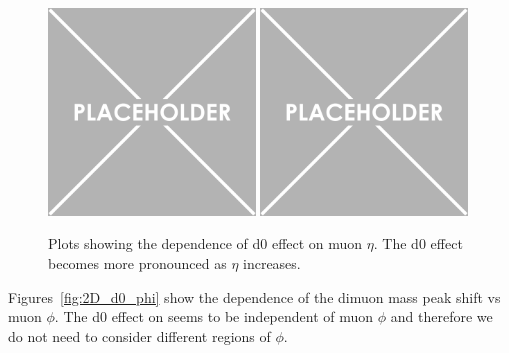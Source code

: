 \begin{figure}[h!]
    \centering
    \includegraphics[width=0.49\textwidth]{images_geofit/dimu_mass_vs_eta_MC.png}
    \includegraphics[width=0.49\textwidth]{images_geofit/dimu_mass_vs_eta_data.png}
    \caption{Plots showing the dependence of d0 effect on muon $\eta$. The d0 effect becomes more pronounced as $\eta$ increases.}
    \label{fig:2D_d0_eta}
\end{figure}

Figures~\ref{fig:2D_d0_phi} show the dependence of the dimuon mass peak shift vs muon $\phi$. The d0 effect on \pt seems to be independent of muon $\phi$ and therefore we do not need to consider different regions of $\phi$.

